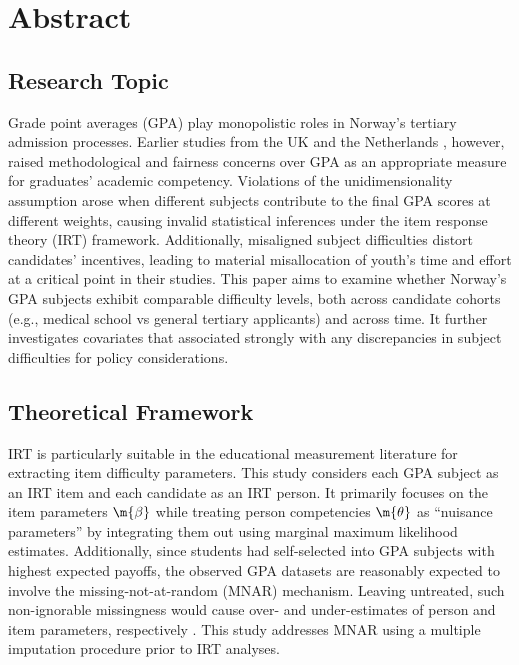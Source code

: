 \section{Abstract}


\subsection{Research Topic}

Grade point averages (GPA) play monopolistic roles in Norway's tertiary admission processes. Earlier studies from the UK \parencite{he:2018} and the Netherlands \parencite{korobko:2008}, however, raised methodological and fairness concerns over GPA as an appropriate measure for graduates' academic competency. Violations of the unidimensionality assumption arose when different subjects contribute to the final GPA scores at different weights, causing invalid statistical inferences under the item response theory (IRT) framework. Additionally, misaligned subject difficulties distort candidates' incentives, leading to material misallocation of youth's time and effort at a critical point in their studies. This paper aims to examine whether Norway's GPA subjects exhibit comparable difficulty levels, both across candidate cohorts (e.g., medical school vs general tertiary applicants) and across time. It further investigates covariates that associated strongly with any discrepancies in subject difficulties for policy considerations.

\subsection{Theoretical Framework}

IRT is particularly suitable in the educational measurement literature for extracting item difficulty parameters. This study considers each GPA subject as an IRT item and each candidate as an IRT person. It primarily focuses on the item parameters $\m{\beta}$ while treating person competencies $\m{\theta}$ as ``nuisance parameters'' by integrating them out using marginal maximum likelihood estimates. Additionally, since students had self-selected into GPA subjects with highest expected payoffs, the observed GPA datasets are reasonably expected to involve the missing-not-at-random (MNAR) mechanism. Leaving untreated, such non-ignorable missingness would cause over- and under-estimates of person and item parameters, respectively \parencite{rose:2013}. This study addresses MNAR using a multiple imputation procedure prior to IRT analyses.

